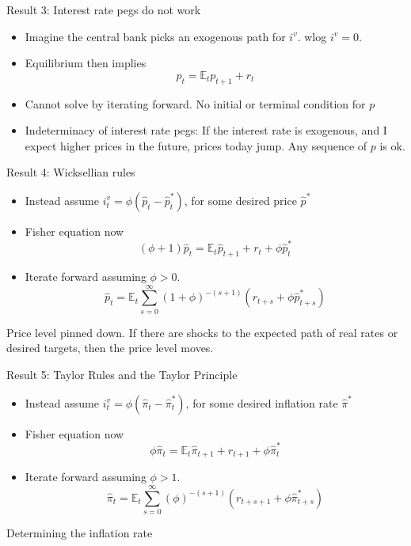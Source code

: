 \documentclass[11pt,aspectratio=169,xcolor={dvipsnames},hyperref={pdftex,pdfpagemode=UseNone,hidelinks,pdfdisplaydoctitle=true},usepdftitle=false]{beamer}
\begin{document}
\begin{frame}{Result 3: Interest rate pegs do not work}
\begin{itemize}
\item Imagine the central bank picks an exogenous path for $i^v$. wlog $i^v = 0$.
\item Equilibrium then implies $$p_t = \mathbb{E}_t p_{t+1}  + r_t$$
\item Cannot solve by iterating forward. No initial or terminal condition for $p$
\item Indeterminacy of interest rate pegs: If the interest rate is exogenous, and I expect higher prices in the future, prices today jump. Any sequence of $p$ is ok.
\end{itemize}
\end{frame}

\begin{frame}{Result 4: Wicksellian rules}
\begin{itemize}
\item Instead assume $i^v_t = \phi (\hat{p}_t - \hat{p}_t^*)$, for some desired price $\hat{p}^*$
\item Fisher equation now $$(\phi + 1)\hat{p}_t = \mathbb{E}_t \hat{p}_{t+1} + r_t + \phi \hat{p}^*_t$$
\item Iterate forward assuming $\phi > 0$. $$\hat{p}_t = \mathbb{E}_t \sum_{s= 0}^{\infty} (1+\phi)^{-(s+1)}(r_{t+s} + \phi \hat{p}^*_{t+s})$$	 
\end{itemize}
Price level pinned down. If there are shocks to the expected path of real rates or desired targets, then the price level moves.
\end{frame}

\begin{frame}{Result 5: Taylor Rules and the Taylor Principle}
\begin{itemize}
\item Instead assume $i^v_t = \phi (\hat{\pi}_t - \hat{\pi}_t^*)$, for some desired inflation rate $\hat{\pi}^*$
\item Fisher equation now $$\phi \hat{\pi}_t = \mathbb{E}_t \hat{\pi}_{t+1} + r_{t+1} + \phi \hat{\pi}^*_t$$
\item Iterate forward assuming $\phi > 1$. $$\hat{\pi}_t = \mathbb{E}_t \sum_{s= 0}^{\infty} (\phi)^{-(s+1)}(r_{t+s+1} + \phi \hat{\pi}^*_{t+s})$$	 
\end{itemize}
Determining the inflation rate
\end{frame}
\end{document}
